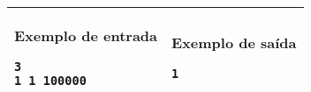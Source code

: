 \begin{table}[!h]
\centering
\hspace{-2cm}
\begin{tabular}{|l|l|}
\hline
\begin{minipage}[t]{5.5in}
\textbf{Exemplo de entrada}
\begin{verbatim}
3
1 1 100000
\end{verbatim}
\vspace{1mm}
\end{minipage}
&
\begin{minipage}[t]{1.5in}
\textbf{Exemplo de saída}
\begin{verbatim}
1
\end{verbatim}
\vspace{1mm}
\end{minipage} \\
\hline
\end{tabular}
\end{table}
